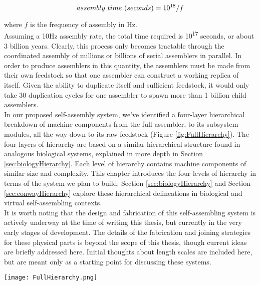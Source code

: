 {\[assembly\ time\ (seconds) = 10\textsuperscript{18}/f\]

where $f$ is the frequency of assembly in Hz.\\

Assuming a 10Hz assembly rate, the total time required is 10\textsuperscript{17} seconds, or about 3 billion years.  Clearly, this process only becomes tractable through the coordinated assembly of millions or billions of serial assemblers in parallel.  In order to produce assemblers in this quantity, the assemblers must be made from their own feedstock so that one assembler can construct a working replica of itself.  Given the ability to duplicate itself and sufficient feedstock, it would only take 30 duplication cycles for one assembler to spawn more than 1 billion child assemblers.\\

In our proposed self-assembly system, we've identified a four-layer hierarchical breakdown of machine components from the full assembler, to its subsystem modules, all the way down to its raw feedstock (Figure \ref{fig:FullHierarchy}).  The four layers of hierarchy are based on a similar hierarchical structure found in analogous biological systems, explained in more depth in Section \ref{sec:biologyHierarchy}.  Each level of hierarchy contains machine components of similar size and complexity.  This chapter introduces the four levels of hierarchy in terms of the system we plan to build.  Section \ref{sec:biologyHierarchy} and Section \ref{sec:conwayHierarchy} explore these hierarchical delineations in biological and virtual self-assembling contexts.\\ 

It is worth noting that the design and fabrication of this self-assembling system is actively underway at the time of writing this thesis, but currently in the very early stages of development.  The details of the fabrication and joining strategies for these physical parts is beyond the scope of this thesis, though current ideas are briefly addressed here.  Initial thoughts about length scales are included here, but are meant only as a starting point for discussing these systems.


\begin{sidewaysfigure}
 \texttt{[image: FullHierarchy.png]}
  \caption{Diagram of the hierarchical breakdown of functional parts into functional primitives and elements.  Examples of the geometric layout of elements to form functional primitives are indicated for a 1DOF bending flexure and a capacitor.  Images of fabricated functional parts are shown alongside their functional primitive decompositions.  More detailed views of the transition from elements to functional primitives and from functional primitives to functional parts are shown in Figures \ref{fig:Hierarchy-ElementsParts} and \ref{fig:Hierarchy-FunctionPrimitivesParts}.  \textit{Image Credit (for photos of fabricated functional parts): Will Langford 2016} }
  \label{fig:FullHierarchy}
\end{sidewaysfigure}

}
